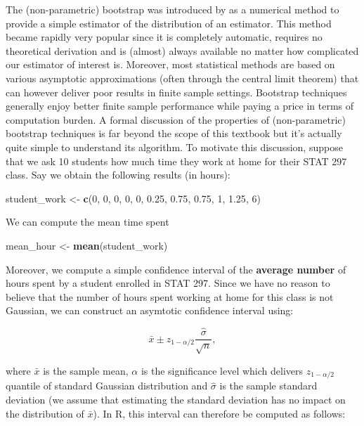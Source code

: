 \documentclass[12pt,]{krantz}
\newenvironment{Shaded}{\begin{snugshade}}{\end{snugshade}}
\newcommand{\KeywordTok}[1]{\textcolor[rgb]{0.27,0.27,0.27}{\textbf{#1}}}
\newcommand{\DecValTok}[1]{\textcolor[rgb]{0.06,0.06,0.06}{#1}}
\newcommand{\FloatTok}[1]{\textcolor[rgb]{0.06,0.06,0.06}{#1}}
\newcommand{\StringTok}[1]{\textcolor[rgb]{0.5,0.5,0.5}{#1}}
\newcommand{\NormalTok}[1]{#1}
\begin{document}
The (non-parametric) bootstrap was introduced by
\citet{efron1979bootstrap} as a numerical method to provide a simple
estimator of the distribution of an estimator. This method became
rapidly very popular since it is completely automatic, requires no
theoretical derivation and is (almost) always available no matter how
complicated our estimator of interest is. Moreover, most statistical
methods are based on various asymptotic approximations (often through
the central limit theorem) that can however deliver poor results in
finite sample settings. Bootstrap techniques generally enjoy better
finite sample performance while paying a price in terms of computation
burden. A formal discussion of the properties of (non-parametric)
bootstrap techniques is far beyond the scope of this textbook but it's
actually quite simple to understand its algorithm. To motivate this
discussion, suppose that we ask 10 students how much time they work at
home for their STAT 297 class. Say we obtain the following results (in
hours):

\begin{Shaded}
\begin{Highlighting}[]
\NormalTok{student_work <-}\StringTok{ }\KeywordTok{c}\NormalTok{(}\DecValTok{0}\NormalTok{, }\DecValTok{0}\NormalTok{, }\DecValTok{0}\NormalTok{, }\DecValTok{0}\NormalTok{, }\DecValTok{0}\NormalTok{, }\FloatTok{0.25}\NormalTok{, }\FloatTok{0.75}\NormalTok{, }\FloatTok{0.75}\NormalTok{, }\DecValTok{1}\NormalTok{, }\FloatTok{1.25}\NormalTok{, }\DecValTok{6}\NormalTok{)}
\end{Highlighting}
\end{Shaded}

We can compute the mean time spent

\begin{Shaded}
\begin{Highlighting}[]
\NormalTok{mean_hour <-}\StringTok{ }\KeywordTok{mean}\NormalTok{(student_work)}
\end{Highlighting}
\end{Shaded}

Moreover, we compute a simple confidence interval of the \textbf{average
number} of hours spent by a student enrolled in STAT 297. Since we have
no reason to believe that the number of hours spent working at home for
this class is not Gaussian, we can construct an asymtotic confidence
interval using:

\[
\bar{x} \pm z_{1-\alpha/2} \frac{\hat{\sigma}}{\sqrt{n}},
\]

where \(\bar{x}\) is the sample mean, \(\alpha\) is the significance
level which delivers \(z_{1-\alpha/2}\) quantile of standard Gaussian
distribution and \(\hat{\sigma}\) is the sample standard deviation (we
assume that estimating the standard deviation has no impact on the
distribution of \(\bar{x}\)). In R, this interval can therefore be
computed as follows:
\end{document}
